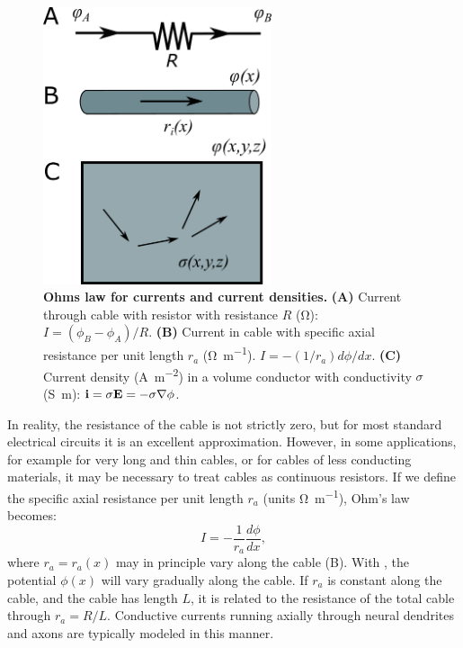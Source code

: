 \begin{figure}[!ht]
\begin{center}
\includegraphics[width=0.6\textwidth]{Figures/Basics/Currents.png}
\end{center}
\caption{{\bf Ohms law for currents and current densities.} {\bf (A)} Current through cable with resistor with resistance $R$ (\si{\ohm}): $I = (\phi_B-\phi_A)/R$. {\bf (B)} Current in cable with specific axial resistance per unit length $r_a$ (\si{\ohm\per\metre}).  $I=- (1/r_a) d\phi/dx$. {\bf (C)} Current density (\si{\ampere\per\square\metre}) in a volume conductor with conductivity $\sigma$ (\si{\siemens\metre}): ${\bf i} = \sigma {\bf E} = - \sigma {\bf \nabla} \phi$.}
\label{fig:Basics:Currents}
\end{figure}

In reality, the resistance of the cable is not strictly zero, but for most standard electrical circuits it is an excellent approximation. However, in some applications, for example for very long and thin cables, or for cables of less conducting  materials, it may be necessary to treat cables as continuous resistors. If we define the specific axial resistance per unit length $r_{a}$ (units \si{\ohm\per\metre}), Ohm's law becomes: 
\begin{equation}
I = - \frac{1}{r_a}\frac{d\phi}{dx}, 
\label{eq:Basics:Ohm_r}
\end{equation}
where $r_a=r_a(x)$ may in principle vary along the cable (B). With , the potential $\phi(x)$ will vary gradually along the cable. If $r_a$ is constant along the cable, and the cable has length $L$, it is related to the resistance of the total cable through $r_a=R/L$. Conductive currents running axially through neural dendrites and axons are typically modeled in this manner. 

